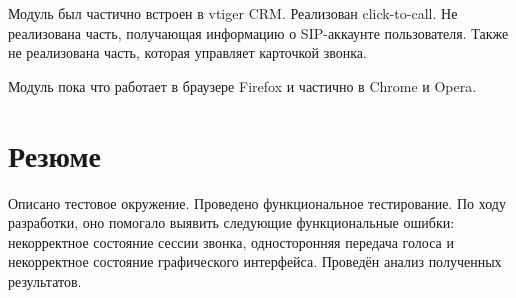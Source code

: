 Модуль был частично встроен в vtiger CRM. Реализован click-to-call. Не реализована часть, получающая информацию о SIP-аккаунте пользователя. Также не реализована часть, которая управляет карточкой звонка.

Модуль пока что работает в браузере Firefox и частично в Chrome и Opera.

\section{Резюме}

Описано тестовое окружение. Проведено функциональное тестирование. По ходу разработки, оно помогало выявить следующие функциональные ошибки: некорректное состояние сессии звонка, односторонняя передача голоса и некорректное состояние графического интерфейса. Проведён анализ полученных результатов.
